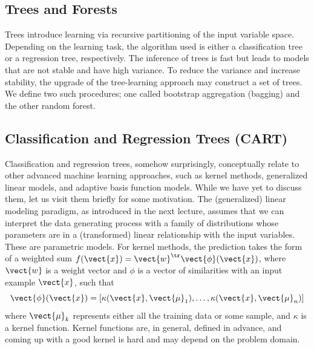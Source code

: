 \begin{refsection}
\chapter{Trees and Forests}

\begin{summary}
Trees introduce learning via recursive partitioning of the input variable space. Depending on the learning task, the algorithm used is either a classification tree or a regression tree, respectively. The inference of trees is fast but leads to models that are not stable and have high variance. To reduce the variance and increase stability, the upgrade of the tree-learning approach may construct a set of trees. We define two such procedures; one called bootstrap aggregation (bagging) and the other random forest.
\end{summary}

\section{Classification and Regression Trees (CART)}

Classification and regression trees, somehow surprisingly, conceptually relate to other advanced machine learning approaches, such as kernel methods, generalized linear models, and adaptive basis function models. While we have yet to discuss them, let us visit them briefly for some motivation. The (generalized) linear modeling paradigm, as introduced in the next lecture, assumes that we can interpret the data generating process with a family of distributions whose parameters are in a (transformed) linear relationship with the input variables. These are parametric models. For kernel methods, the prediction takes the form of a weighted sum $f(\vect{x})=\vect{w}^\tr\vect{\phi}(\vect{x})$, where $\vect{w}$ is a weight vector and $\phi$ is a vector of similarities with an input example $\vect{x}$, such that
$$ \vect{\phi}(\vect{x}) = [\kappa(\vect{x},\vect{\mu}_1), \ldots, \kappa(\vect{x},\vect{\mu}_n)] $$
where $\vect{\mu}_k$ represents either all the training data or some sample, and $\kappa$ is a kernel function. Kernel functions are, in general, defined in advance, and coming up with a good kernel is hard and may depend on the problem domain.


\end{refsection}
